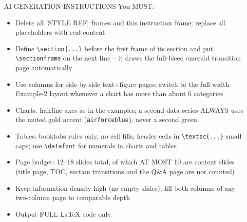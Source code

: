 \documentclass[aspectratio=169,10pt,xcolor=table]{beamer}
\begin{document}
\begin{frame}{AI GENERATION INSTRUCTIONS}
\footnotesize
You MUST:
\begin{itemize}
\item Delete all [STYLE REF] frames and this instruction frame; replace all
      placeholders with real content
\item Define \texttt{\textbackslash section\{...\}} before the first frame of its
      section and put \texttt{\textbackslash sectionframe} on the next line --
      it draws the full-bleed emerald transition page automatically
\item Use columns for side-by-side text+figure pages; switch to the full-width
      Example-2 layout whenever a chart has more than about 6 categories
\item Charts: hairline axes as in the examples; a second data series ALWAYS
      uses the muted gold accent (\texttt{airforceblue}), never a second green
\item Tables: booktabs rules only, no cell fills; header cells in
      \texttt{\textbackslash textsc\{...\}} small caps; use
      \texttt{\textbackslash datafont} for numerals in charts and tables
\item Page budget: 12--18 slides total, of which AT MOST 10 are content slides
      (title page, TOC, section transitions and the Q\&A page are not counted)
\item Keep information density high (no empty slides); fill both columns of any
      two-column page to comparable depth
\item Output FULL LaTeX code only
\end{itemize}
\end{frame}

\QApage
\end{document}
